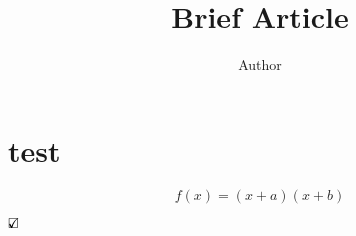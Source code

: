 \documentclass[11pt]{article} %
\title{Brief Article}
\author{Author}
\newcommand{\checked}[0]{\mbox{\mathsurround=0pt \makebox[0pt][l]{$\checkmark$}$\square$}}
\begin{document}
\maketitle
\tableofcontents

\section{test}

\begin{equation}
     f(x)=(x+a)(x+b)
 \end{equation}

$\checked$

\end{document}
